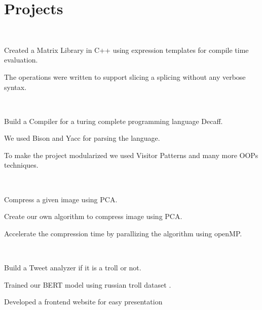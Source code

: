 \documentclass[]{resume-openfont}
\begin{document}
\section{Projects}
\\
\begin{tightemize}
    \item Created a Matrix Library in C++ using expression templates for compile time evaluation.
    \item The operations were written to support slicing a splicing without any verbose syntax.
\end{tightemize}

\\
\begin{tightemize}
    \item Build a Compiler for a turing complete programming language Decaff.
    \item We used Bison and Yacc for parsing the language.
    \item To make the project modularized we used Visitor Patterns and many more OOPs techniques.
\end{tightemize}
\sectionsep
  
\hfill \\
\begin{tightemize}
    \item Compress a given image using PCA.
    \item Create our own algorithm to compress image using PCA.
    \item Accelerate the compression time by parallizing the algorithm using openMP.
\end{tightemize}
\sectionsep

 \\
\begin{tightemize}
    \item Build a Tweet analyzer if it is a troll or not.
    \item Trained our BERT model using russian troll dataset .
    \item Developed a frontend website for easy presentation
\end{tightemize}
\sectionsep
\end{document}
